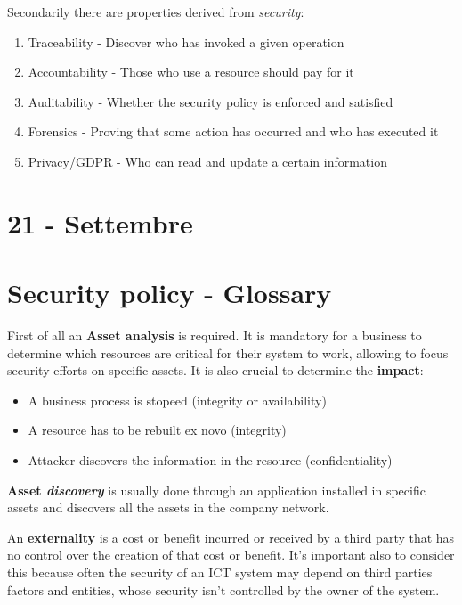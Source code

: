 Secondarily there are properties derived from \textit{security}:
\begin{enumerate}
    \item Traceability - Discover who has invoked a given operation
    \item Accountability - Those who use a resource should pay for it
    \item Auditability - Whether the security policy is enforced and satisfied
    \item Forensics - Proving that some action has occurred and who has executed it
    \item Privacy/GDPR - Who can read and update a certain information
\end{enumerate}


\section*{21 - Settembre}

\section{Security policy - Glossary}
First of all an \textbf{Asset analysis} is required.
It is mandatory for a business to determine which resources are critical for their system to work,
allowing to focus security efforts on specific assets.\nl
It is also crucial to determine the \textbf{impact}:
\begin{itemize}
    \item A business process is stopeed (integrity or availability)
    \item A resource has to be rebuilt ex novo (integrity)
    \item Attacker discovers the information in the resource (confidentiality)
\end{itemize}

\textbf{Asset \textit{discovery}} is usually done through an application installed in specific assets and discovers all the assets in the company network.\nl

An \textbf{externality} is a cost or benefit incurred or received by a third party that has no control over the creation of that cost or benefit.
It's important also to consider this because often the security of an ICT system may depend on third parties factors and entities,
whose security isn't controlled by the owner of the system.\nl


